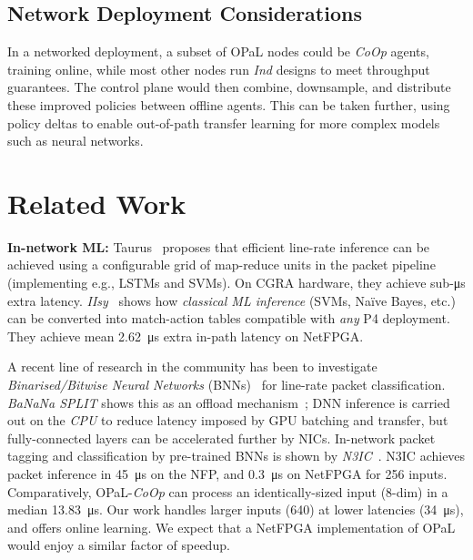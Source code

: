 \documentclass[
conference
,10pt
]{IEEEtran}
\newcommand{\fakepara}[1]{\noindent\textbf{#1:}}
\newcommand{\approachshort}{OPaL}
\newcommand{\Coopfw}{\emph{CoOp}}
\newcommand{\coopfw}{\Coopfw}
\newcommand{\Indfw}{\emph{Ind}}
\newcommand{\indfw}{\Indfw}
\begin{document}
\subsection{Network Deployment Considerations}
In a networked deployment, a subset of \approachshort{} nodes could be \coopfw{} agents, training online, while most other nodes run \indfw{} designs to meet throughput guarantees.
The control plane would then combine, downsample, and distribute these improved policies between offline agents.
This can be taken further, using policy deltas to enable out-of-path transfer learning for more complex models such as neural networks.

\section{Related Work}
\fakepara{In-network ML}
Taurus~\parencite{DBLP:journals/corr/abs-2002-08987} proposes that efficient line-rate inference can be achieved using a configurable grid of map-reduce units in the packet pipeline (implementing e.g., LSTMs and SVMs).
On CGRA hardware, they achieve sub-\si{\micro\second} extra latency.
\emph{IIsy}~\parencite{DBLP:conf/hotnets/XiongZ19} shows how \emph{classical ML inference} (SVMs, Na\"{i}ve Bayes, etc.) can be converted into match-action tables compatible with \emph{any} P4 deployment.
They achieve mean \SI{2.62}{\micro\second} extra in-path latency on NetFPGA.

A recent line of research in the community has been to investigate \emph{Binarised/Bitwise Neural Networks} (BNNs)~\parencite{DBLP:conf/nips/HubaraCSEB16,DBLP:journals/corr/KimS16,DBLP:journals/corr/MiyashitaLM16} for line-rate packet classification.
\emph{BaNaNa SPLIT} shows this as an offload mechanism~\parencite{DBLP:conf/sigcomm/SanvitoSB18,DBLP:journals/corr/abs-1801-05731}; DNN inference is carried out on the \emph{CPU} to reduce latency imposed by GPU batching and transfer, but fully-connected layers can be accelerated further by NICs.
In-network packet tagging and classification by pre-trained BNNs is shown by \emph{N3IC}~\parencite{DBLP:journals/corr/abs-2009-02353}.
N3IC achieves packet inference in \SI{45}{\micro\second} on the NFP, and \SI{0.3}{\micro\second} on NetFPGA for \SI{256}{\bit} inputs.
Comparatively, \approachshort{}-\Coopfw{} can process an identically-sized input (8-dim) in a median \SI{13.83}{\micro\second}.
Our work handles larger inputs (\SI{640}{\bit}) at lower latencies (\SI{34}{\micro\second}), and offers online learning.
We expect that a NetFPGA implementation of \approachshort{} would enjoy a similar factor of speedup.
\end{document}
